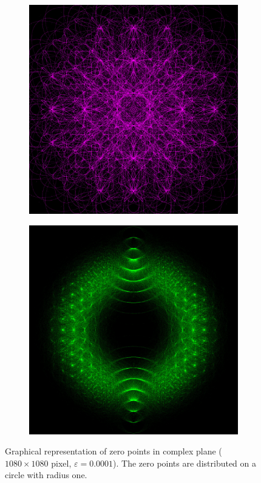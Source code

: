 \documentclass[a4paper,headsepline=3pt,headinclude=true,12pt,oneside]{scrartcl}
\begin{document}
\begin{onehalfspace}
\begin{figure}[h]
		\begin{subfigure}{0.5\textwidth}
		    \includegraphics[width=\textwidth]{doc/deg4Both60M.jpg}
		\end{subfigure}\hfill
		\begin{subfigure}{0.5\textwidth}
		    \includegraphics[width=\textwidth]{doc/deg12Repm40M.jpg}
		\end{subfigure}
		\caption{Graphical representation of zero points in complex plane ($1080\times 1080$ pixel, $\varepsilon=0.0001$). The zero points are distributed on a circle with radius one.}
		\label{img}
	\end{figure}
	
\end{onehalfspace}
\end{document}
